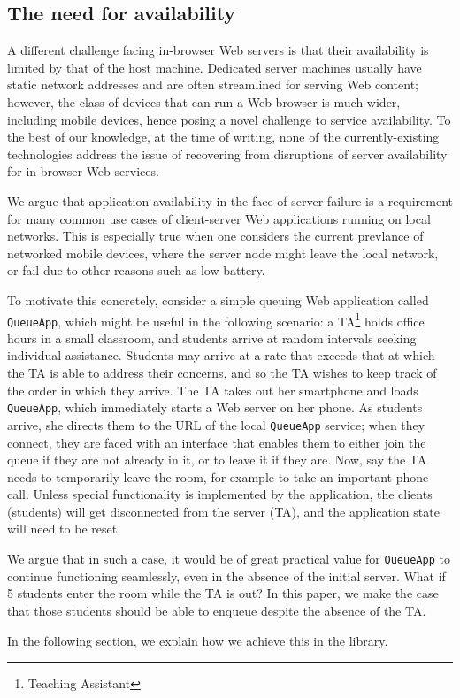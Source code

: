 \subsection{The need for availability}
\label{sec:background_motivation}

A different challenge facing in-browser Web servers is that their availability is limited by that of the host machine.
Dedicated server machines usually have static network addresses and are often streamlined for serving Web content; however, the class of devices that can run a Web browser is much wider, including mobile devices, hence posing a novel challenge to service availability.
To the best of our knowledge, at the time of writing, none of the currently-existing technologies address the issue of recovering from disruptions of server availability for in-browser Web services.

We argue that application availability in the face of server failure is a requirement for many common use cases of client-server Web applications running on local networks.
This is especially true when one considers the current prevlance of networked mobile devices, where the server node might leave the local network, or fail due to other reasons such as low battery.

To motivate this concretely, consider a simple queuing Web application called \texttt{QueueApp}, which might be useful in the following scenario: a TA\footnote{Teaching Assistant} holds office hours in a small classroom, and students arrive at random intervals seeking individual assistance.
Students may arrive at a rate that exceeds that at which the TA is able to address their concerns, and so the TA wishes to keep track of the order in which they arrive.
The TA takes out her smartphone and loads \texttt{QueueApp}, which immediately starts a Web server on her phone.
As students arrive, she directs them to the URL of the local \texttt{QueueApp} service; when they connect, they are faced with an interface that enables them to either join the queue if they are not already in it, or to leave it if they are.
Now, say the TA needs to temporarily leave the room, for example to take an important phone call.
Unless special functionality is implemented by the application, the clients (students) will get disconnected from the server (TA), and the application state will need to be reset.

We argue that in such a case, it would be of great practical value for \texttt{QueueApp} to continue functioning seamlessly, even in the absence of the initial server.
What if 5 students enter the room while the TA is out?
In this paper, we make the case that those students should be able to enqueue despite the absence of the TA.

In the following section, we explain how we achieve this in the \APIName library.
